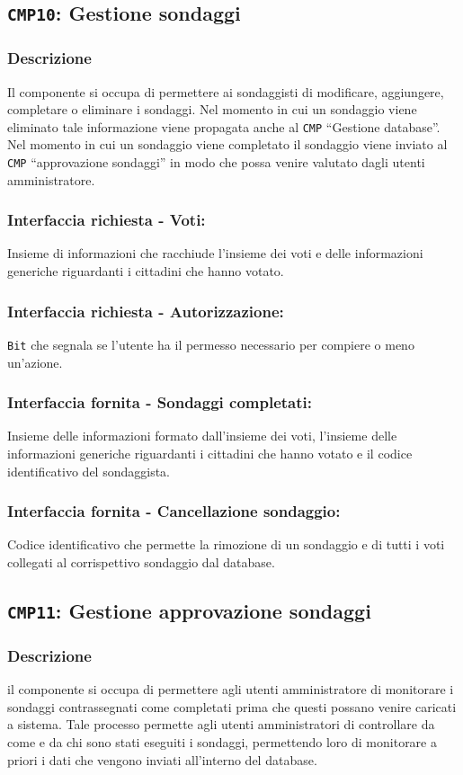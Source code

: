     \subsection{\texttt{CMP10}: Gestione sondaggi}
        \subsubsection{Descrizione}
            Il componente si occupa di permettere ai sondaggisti di modificare, aggiungere, completare o eliminare i sondaggi. Nel momento in cui un sondaggio viene eliminato tale informazione viene propagata anche al \texttt{CMP} ``Gestione database''. Nel momento in cui un sondaggio viene completato il sondaggio viene inviato al \texttt{CMP} ``approvazione sondaggi'' in modo che possa venire valutato dagli utenti amministratore.
        \subsubsection{Interfaccia richiesta - Voti:}
            Insieme di informazioni che racchiude l'insieme dei voti e delle informazioni generiche riguardanti i cittadini che hanno votato.
        \subsubsection{Interfaccia richiesta - Autorizzazione:}
            \texttt{Bit} che segnala se l'utente ha il permesso necessario per compiere o meno un'azione.
        \subsubsection{Interfaccia fornita - Sondaggi completati:}
            Insieme delle informazioni formato dall'insieme dei voti, l'insieme delle informazioni generiche riguardanti i cittadini che hanno votato e il codice identificativo del sondaggista.
        \subsubsection{Interfaccia fornita - Cancellazione sondaggio:}
            Codice identificativo che permette la rimozione di un sondaggio e di tutti i voti collegati al corrispettivo sondaggio dal database.

    \subsection{\texttt{CMP11}: Gestione approvazione sondaggi}
        \subsubsection{Descrizione}
            il componente si occupa di permettere agli utenti amministratore di monitorare i sondaggi contrassegnati come completati prima che questi possano venire caricati a sistema. Tale processo permette agli utenti amministratori di controllare da come e da chi sono stati eseguiti i sondaggi, permettendo loro di monitorare a priori i dati che vengono inviati all'interno del database. 
